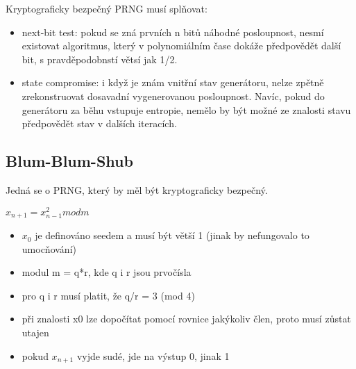\documentclass{szzclass}
\begin{document}
Kryptograficky bezpečný PRNG musí splňovat:
\begin{itemize}
  \item next-bit test: pokud se zná prvních n bitů náhodné posloupnost, nesmí existovat algoritmus, který
  v polynomiálním čase dokáže předpovědět další bit, s pravděpodobnstí větsí jak 1/2.
  \item state compromise: i když je znám vnitřní stav generátoru, nelze zpětně zrekonstruovat dosavadní vygenerovanou
  posloupnost. Navíc, pokud do generátoru za běhu vstupuje entropie, nemělo by být možné ze znalosti stavu
  předpovědět stav v dalších iteracích.
\end{itemize}

\subsection{Blum-Blum-Shub}
Jedná se o PRNG, který by měl být kryptograficky bezpečný.
\begin{center}
  $x_{n+1} = x^2_{n-1} mod m$
\end{center}
\begin{itemize}
  \item $x_0$ je definováno seedem a musí být větší 1 (jinak by nefungovalo to umocňování)
  \item modul m = q*r, kde q i r jsou prvočísla
  \item pro q i r musí platit, že q/r = 3 (mod 4)
  \item při znalosti x0 lze dopočítat pomocí rovnice jakýkoliv člen, proto musí zůstat utajen
  \item pokud $x_{n+1}$ vyjde sudé, jde na výstup 0, jinak 1
\end{itemize}
\end{document}

